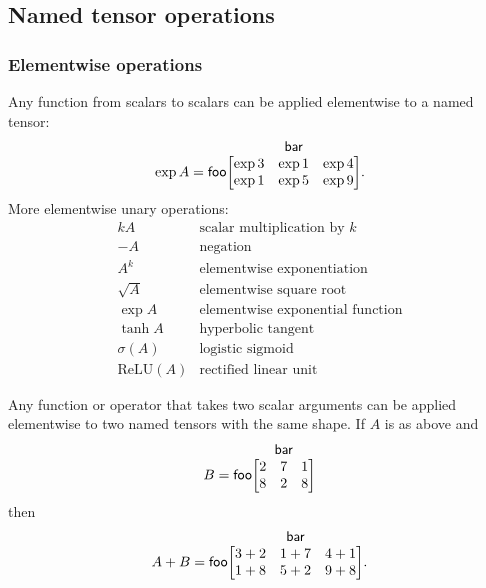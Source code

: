 \documentclass{article}
\makeatletter
\newcommand{\nmatrix}[3]{\name{#1}\begin{array}[b]{@{}c@{}}\name{#2}\\\begin{bmatrix}#3\end{bmatrix}\end{array}}
\makeatother
\begin{document}
\subsection{Named tensor operations}
\label{sec:operations}

\subsubsection{Elementwise operations}

Any function from scalars to scalars can be applied elementwise to a named tensor:
\begin{equation*}
\exp A = \nmatrix{foo}{bar}{
  \exp 3 & \exp 1 & \exp 4 \\
  \exp 1 & \exp 5 & \exp 9
}.
\end{equation*}
More elementwise unary operations:
\[\begin{array}{cl}
kA & \text{scalar multiplication by $k$} \\
-A & \text{negation} \\
A^k & \text{elementwise exponentiation} \\
\sqrt{A} &\text{elementwise square root} \\
\exp A & \text{elementwise exponential function} \\
\tanh A & \text{hyperbolic tangent} \\
\sigma(A) & \text{logistic sigmoid} \\
\text{ReLU}(A) & \text{rectified linear unit}
\end{array}\]

Any function or operator that takes two scalar arguments can be applied elementwise to two named tensors with the same shape. If $A$ is as above and
\begin{equation*}
B = \nmatrix{foo}{bar}{
  2 & 7 & 1 \\
  8 & 2 & 8
}
\end{equation*}
then
\begin{equation*}
A + B = \nmatrix{foo}{bar}{
  3+2 & 1+7 & 4+1 \\
  1+8 & 5+2 & 9+8
}.
\end{equation*}
\end{document}

